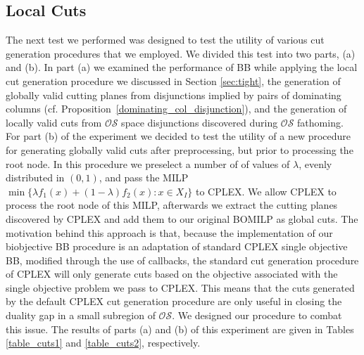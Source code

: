 \documentclass[11.5pt]{article}
\newcommand{\OS}{\mathcal{OS}}
\begin{document}
\subsection{Local Cuts}

The next test we performed was designed to test the utility of various cut generation procedures that we employed. We divided this test into two parts, (a) and (b). In part (a) we examined the performance of BB while applying the local cut generation procedure we discussed in Section \ref{sec:tight}, the generation of globally valid cutting planes from disjunctions implied by pairs of dominating columns (cf. Proposition~\ref{dominating_col_disjunction}), and the generation of locally valid cuts from $\OS$ space disjunctions discovered during $\OS$ fathoming. For part (b) of the experiment we decided to test the utility of a new procedure for generating globally valid cuts after preprocessing, but prior to processing the root node. In this procedure we preselect a number of of values of $\lambda$, evenly distributed in $(0,1)$, and pass the MILP $\min\{\lambda f_1(x) + (1-\lambda) f_2(x): x \in X_I\}$ to CPLEX. We allow CPLEX to process the root node of this MILP, afterwards we extract the cutting planes discovered by CPLEX and add them to our original BOMILP as global cuts. The motivation behind this approach is that, because the implementation of our biobjective BB procedure is an adaptation of standard CPLEX single objective BB, modified through the use of callbacks, the standard cut generation procedure of CPLEX will only generate cuts based on the objective associated with the single objective problem we pass to CPLEX. This means that the cuts generated by the default CPLEX cut generation procedure are only useful in closing the duality gap in a small subregion of $\OS$. We designed our procedure to combat this issue. The results of parts (a) and (b) of this experiment are given in Tables \ref{table_cuts1} and \ref{table_cuts2}, respectively.
\end{document}
